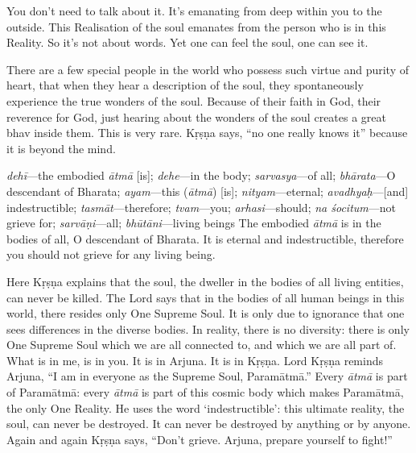 You don’t need to talk about it. It’s emanating from deep within you to the outside. This Realisation of the soul emanates from the person who is in this Reality. So it’s not about words. Yet one can feel the soul, one can see it.

There are a few special people in the world who possess such virtue and purity of heart, that when they hear a description of the soul, they spontaneously experience the true wonders of the soul. Because of their faith in God, their reverence for God, just hearing about the wonders of the soul creates a great bhav inside them. This is very rare. Kṛṣṇa says, “no one really knows it” because it is beyond the mind.

{%
  \textit{dehī}---the embodied \textit{ātmā} [is]; 
  \textit{dehe}---in the body; 
  \textit{sarvasya}---of all; 
  \textit{bhārata}---O descendant of Bharata; 
  \textit{ayam}---this (\textit{ātmā}) [is]; 
  \textit{nityam}---eternal; 
  \textit{avadhyaḥ}---[and] indestructible; 
  \textit{tasmāt}---therefore; 
  \textit{tvam}---you; 
  \textit{arhasi}---should; 
  \textit{na śocitum}---not grieve for; 
  \textit{sarvāṇi}---all; 
  \textit{bhūtāni}---living beings
}
{%
  The embodied \textit{ātmā} is in the bodies of all, O descendant of Bharata. It is eternal and indestructible, therefore you should not grieve for any living being.
}

Here Kṛṣṇa explains that the soul, the dweller in the bodies of all living entities, can never be killed. The Lord says that in the bodies of all human beings in this world, there resides only One Supreme Soul. It is only due to ignorance that one sees differences in the diverse bodies. In reality, there is no diversity: there is only One Supreme Soul which we are all connected to, and which we are all part of. What is in me, is in you. It is in Arjuna. It is in Kṛṣṇa. Lord Kṛṣṇa reminds Arjuna, “I am in everyone as the Supreme Soul, Paramātmā.” Every \textit{ātmā} is part of Paramātmā: every \textit{ātmā} is part of this cosmic body which makes Paramātmā, the only One Reality. He uses the word ‘indestructible’: this ultimate reality, the soul, can never be destroyed. It can never be destroyed by anything or by anyone. Again and again Kṛṣṇa says, “Don’t grieve. Arjuna, prepare yourself to fight!”

